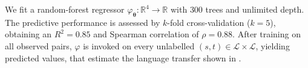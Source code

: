 We fit a random-forest regressor $\varphi_{\boldsymbol{\theta}}:\mathbb{R}^4\!\rightarrow\!\mathbb{R}$ with $300$ trees and unlimited depth.  
The predictive performance is assessed by $k$-fold cross-validation
($k\!=\!5$), obtaining an $R^{2}=0.85$ and Spearman correlation of $\rho=0.88$.
After training on all observed pairs, $\varphi$ is invoked on every unlabelled $(s,t)\!\in\!\mathcal{L}\!\times\!\mathcal{L}$, yielding predicted \btsabb{} values, that estimate the language transfer shown in .



